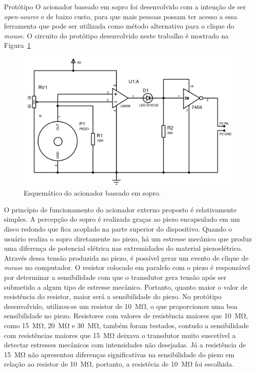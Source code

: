 \begin{chapter}{Protótipo}
O acionador baseado em sopro foi desenvolvido com a intenção de ser
\textit{open-source} e de baixo custo, para que mais pessoas possam ter acesso
a essa ferramenta que pode ser utilizada como método alternativo para o clique
do \textit{mouse}. O circuito do protótipo desenvolvido neste trabalho é mostrado 
na Figura~\ref{fig:circuito}

\begin{figure}[!h]
	\centering
	\begin{minipage}[c]{\textwidth}
	\centering
	\includegraphics[width=0.9\linewidth]{fig/acionador}
	\caption{Esquemático do acionador baseado em sopro.}
	\label{fig:circuito}
	\end{minipage}
\end{figure} 

O princípio de funcionamento do acionador externo proposto é relativamente
simples. A percepção do sopro é realizada graças ao piezo encapsulado em um
disco redondo que fica acoplado na parte superior do dispositivo. Quando o
usuário realiza o sopro diretamente no piezo, há um estresse mecânico que produz
uma diferença de potencial elétrica nas extremidades do material piezoelétrico. 
Através dessa tensão produzida no piezo, é possível gerar um evento de
clique de \textit{mouse} no computador. O resistor colocado em paralelo com o
piezo é responsável por determinar a sensibilidade com que o transdutor gera
tensão após ser submetido a algum tipo de estresse mecânico. Portanto, quanto
maior o valor de resistência do resistor, maior será a sensibilidade do piezo.
No protótipo desenvolvido, utilizou-se um resistor de 10~M\si{\ohm}, o que
proporcionou uma boa sensibilidade no piezo. Resistores com valores de
resistência maiores que 10~M\si{\ohm}, como 15~M\si{\ohm}, 20~M\si{\ohm} e
30~M\si{\ohm}, também foram testados, contudo a sensibilidade com resistências
maiores que 15~M\si{\ohm} deixava o transdutor muito suscetível a detectar
estresses mecânicos com intensidades não desejadas. Já a
resistência de 
15~M\si{\ohm} não apresentou diferenças significativas na sensibilidade do piezo 
em relação ao resistor de 10~M\si{\ohm}, portanto, a resistêcia de 10~M\si{\ohm}
foi escolhida. 


\end{chapter}
